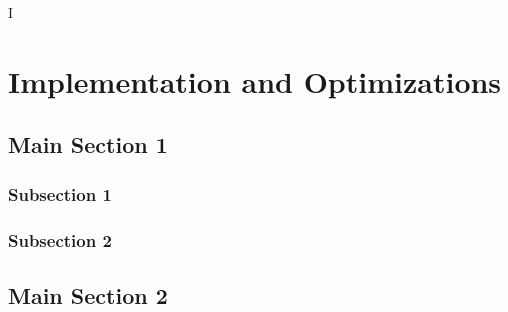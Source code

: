 I%

\chapter{Implementation and Optimizations} %

\label{Implementation} %



\section{Main Section 1}


\subsection{Subsection 1}



\subsection{Subsection 2}



\section{Main Section 2}

